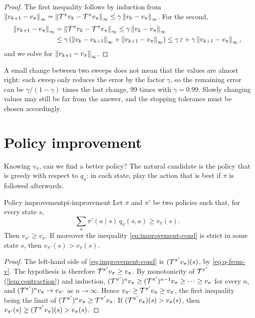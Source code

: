 \begin{proof}
  The first inequality follows by induction from $\left\lVert v_{k+1} -
  v_\pi \right\rVert_\infty = \left\lVert \mathcal{T}^\pi v_k - \mathcal{T}^\pi v_\pi \right\rVert_\infty \leq \gamma
  \left\lVert v_k - v_\pi \right\rVert_\infty$. For the second,
  \begin{align*}
    \left\lVert v_{k+1} - v_\pi \right\rVert_\infty
    &= \left\lVert \mathcal{T}^\pi v_k - \mathcal{T}^\pi v_\pi \right\rVert_\infty
      \leq \gamma \left\lVert v_k - v_\pi \right\rVert_\infty \\
    &\leq \gamma \left( \left\lVert v_k - v_{k+1} \right\rVert_\infty
      + \left\lVert v_{k+1} - v_\pi \right\rVert_\infty \right)
      \leq \gamma\, \varepsilon + \gamma \left\lVert v_{k+1} - v_\pi \right\rVert_\infty,
  \end{align*}
  and we solve for $\left\lVert v_{k+1} - v_\pi \right\rVert_\infty$.
\end{proof}

\begin{intuition}
  A small change between two sweeps does not mean that the values are
  almost right: each sweep only reduces the error by the factor $\gamma$,
  so the remaining error can be $\gamma / (1 - \gamma)$ times the last
  change, $99$ times with $\gamma = 0.99$. Slowly changing values may still
  be far from the answer, and the stopping tolerance must be chosen
  accordingly.
\end{intuition}

\section{Policy improvement}

Knowing $v_\pi$, can we find a better policy? The natural candidate is the
policy that is greedy with respect to $q_\pi$: in each state, play the
action that is best if $\pi$ is followed afterwards.

\begin{theorem}{Policy improvement}{pi-improvement}
  Let $\pi$ and $\pi'$ be two policies such that, for every state $s$,
  \begin{equation}
    \label{eq:improvement-cond}
    \sum_a \pi'(a \mid s)\, q_\pi(s, a) \geq v_\pi(s).
  \end{equation}
  Then $v_{\pi'} \geq v_\pi$. If moreover the inequality
  \eqref{eq:improvement-cond} is strict in some state $s$, then
  $v_{\pi'}(s) > v_\pi(s)$.
\end{theorem}

\begin{proof}
  The left-hand side of \eqref{eq:improvement-cond} is $(\mathcal{T}^{\pi'}
  v_\pi)(s)$, by \eqref{eq:q-from-v}. The hypothesis is therefore
  $\mathcal{T}^{\pi'} v_\pi \geq v_\pi$. By monotonicity of $\mathcal{T}^{\pi'}$
  (\cref{lem:contraction}) and induction, $(\mathcal{T}^{\pi'})^n v_\pi \geq
  (\mathcal{T}^{\pi'})^{n-1} v_\pi \geq \dots \geq v_\pi$ for every $n$, and
  $(\mathcal{T}^{\pi'})^n v_\pi \to v_{\pi'}$ as $n \to \infty$. Hence
  $v_{\pi'} \geq \mathcal{T}^{\pi'} v_\pi \geq v_\pi$, the first inequality
  being the limit of $(\mathcal{T}^{\pi'})^n v_\pi \geq \mathcal{T}^{\pi'} v_\pi$. If
  $(\mathcal{T}^{\pi'} v_\pi)(s) > v_\pi(s)$, then $v_{\pi'}(s) \geq
  (\mathcal{T}^{\pi'} v_\pi)(s) > v_\pi(s)$.
\end{proof}

